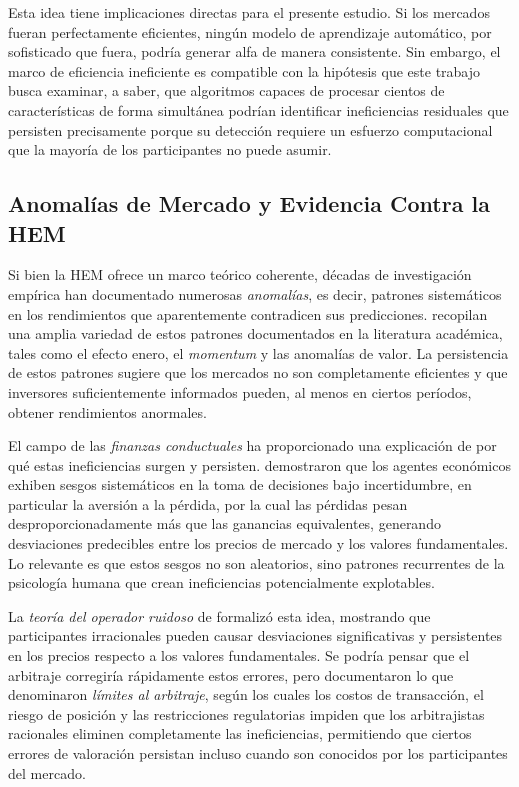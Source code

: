 ﻿\documentclass[11pt,a4paper]{article}
\begin{document}
Esta idea tiene implicaciones directas para el presente estudio. Si los mercados fueran perfectamente eficientes, ning\'un modelo de aprendizaje autom\'atico, por sofisticado que fuera, podr\'ia generar alfa de manera consistente. Sin embargo, el marco de eficiencia ineficiente es compatible con la hip\'otesis que este trabajo busca examinar, a saber, que algoritmos capaces de procesar cientos de caracter\'isticas de forma simult\'anea podr\'ian identificar ineficiencias residuales que persisten precisamente porque su detecci\'on requiere un esfuerzo computacional que la mayor\'ia de los participantes no puede asumir.

\subsection{Anomal\'ias de Mercado y Evidencia Contra la HEM}

Si bien la HEM ofrece un marco te\'orico coherente, d\'ecadas de investigaci\'on emp\'irica han documentado numerosas \textit{anomal\'ias}, es decir, patrones sistem\'aticos en los rendimientos que aparentemente contradicen sus predicciones. \citet{dong2022} recopilan una amplia variedad de estos patrones documentados en la literatura acad\'emica, tales como el efecto enero, el \textit{momentum} y las anomal\'ias de valor. La persistencia de estos patrones sugiere que los mercados no son completamente eficientes y que inversores suficientemente informados pueden, al menos en ciertos per\'iodos, obtener rendimientos anormales.

El campo de las \textit{finanzas conductuales} ha proporcionado una explicaci\'on de por qu\'e estas ineficiencias surgen y persisten. \citet{kahneman1979} demostraron que los agentes econ\'omicos exhiben sesgos sistem\'aticos en la toma de decisiones bajo incertidumbre, en particular la aversi\'on a la p\'erdida, por la cual las p\'erdidas pesan desproporcionadamente m\'as que las ganancias equivalentes, generando desviaciones predecibles entre los precios de mercado y los valores fundamentales. Lo relevante es que estos sesgos no son aleatorios, sino patrones recurrentes de la psicolog\'ia humana que crean ineficiencias potencialmente explotables.

La \textit{teor\'ia del operador ruidoso} de \citet{delong1990} formaliz\'o esta idea, mostrando que participantes irracionales pueden causar desviaciones significativas y persistentes en los precios respecto a los valores fundamentales. Se podr\'ia pensar que el arbitraje corregir\'ia r\'apidamente estos errores, pero \citet{shleifer1997} documentaron lo que denominaron \textit{l\'imites al arbitraje}, seg\'un los cuales los costos de transacci\'on, el riesgo de posici\'on y las restricciones regulatorias impiden que los arbitrajistas racionales eliminen completamente las ineficiencias, permitiendo que ciertos errores de valoraci\'on persistan incluso cuando son conocidos por los participantes del mercado.
\end{document}
